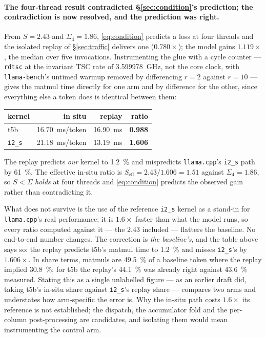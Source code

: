 \documentclass[11pt,a4paper]{article}
\newcommand{\code}[1]{\texttt{#1}}
\begin{document}
\paragraph{The four-thread result contradicted \S\ref{sec:condition}'s
prediction; the contradiction is now resolved, and the prediction was right.}
From $S=\num{2.43}$ and $\Sigma_4=\num{1.86}$, \eqref{eq:condition} predicts a
loss at four threads and the isolated replay of \S\ref{sec:traffic} delivers one
($0.780\times$); the model gains $1.119\times$, the median over five
invocations. Instrumenting the glue with a
cycle counter --- \code{rdtsc} at the invariant TSC rate of
\SI{3.599978}{\giga\hertz}, not the core clock, with \code{llama-bench}'s untimed
warmup removed by differencing $r=2$ against $r=10$ --- gives the matmul time
directly for one arm and by difference for the other, since everything else a
token does is identical between them:

\begin{center}
\begin{tabular}{lrrr}
\toprule
kernel & in situ & replay & ratio \\
\midrule
t5b & \SI{16.70}{\milli\second}/token & \SI{16.90}{\milli\second} & \textbf{0.988} \\
\code{i2\_s} & \SI{21.18}{\milli\second}/token & \SI{13.19}{\milli\second} & \textbf{1.606} \\
\bottomrule
\end{tabular}
\end{center}

The replay predicts \emph{our} kernel to \SI{1.2}{\percent} and mispredicts
\code{llama.cpp}'s \code{i2\_s} path by \SI{61}{\percent}. The effective in-situ
ratio is $S_{\mathrm{eff}} = \num{2.43}/\num{1.606} = \num{1.51}$ against
$\Sigma_4 = \num{1.86}$, so $S<\Sigma$ \emph{holds} at four threads and
\eqref{eq:condition} predicts the observed gain rather than contradicting it.

What does not survive is the use of the reference \code{i2\_s} kernel as a
stand-in for \code{llama.cpp}'s real performance: it is $1.6\times$ faster than
what the model runs, so every ratio computed against it --- the \num{2.43}
included --- flatters the baseline. No end-to-end number changes. The correction is
\emph{the baseline's}, and the table above says so: the replay predicts t5b's
matmul time to \SI{1.2}{\percent} and misses \code{i2\_s}'s by
$1.606\times$. In share terms, matmuls are \SI{49.5}{\percent} of a baseline
token where the replay implied \SI{30.8}{\percent}; for t5b the replay's
\SI{44.1}{\percent} was already right against \SI{43.6}{\percent} measured.
Stating this as a single unlabelled figure --- as an earlier draft did, taking
t5b's in-situ share against \code{i2\_s}'s replay share --- compares two arms
and understates how arm-specific the error is. Why the in-situ path costs $1.6\times$ its reference is not
established; the dispatch, the accumulator fold and the per-column
post-processing are candidates, and isolating them would mean instrumenting the
control arm.
\end{document}
